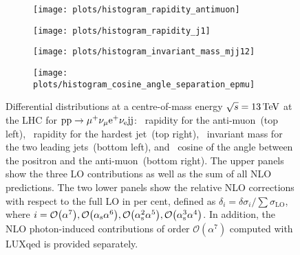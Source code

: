 \documentclass[a4article,11pt]{article}
\begin{document}
\begin{figure}
        \setlength{\parskip}{-10pt}
        \begin{subfigure}{0.49\textwidth}
                \subcaption{}
                \texttt{[image: plots/histogram\_rapidity\_antimuon]}
                \label{plot:rapidity_antimuon}
        \end{subfigure}
        \hfill
        \begin{subfigure}{0.49\textwidth}
                \subcaption{}
                \texttt{[image: plots/histogram\_rapidity\_j1]}
                \label{plot:rapidity_j1} 
        \end{subfigure}
        
        \begin{subfigure}{0.49\textwidth}
                \subcaption{}
                \texttt{[image: plots/histogram\_invariant\_mass\_mjj12]}
                \label{plot:invariant_mass_mjj12}
        \end{subfigure}
        \hfill
        \begin{subfigure}{0.49\textwidth}
                \subcaption{}
                \texttt{[image: plots/histogram\_cosine\_angle\_separation\_epmu]}
                \label{plot:cosine_angle_separation_epmu}
        \end{subfigure}
        
        \vspace*{-3ex}
        \caption{\label{fig:various_distributions}%
                Differential distributions at a centre-of-mass energy $\sqrt{s}=13\,\text{TeV}$ at the LHC for $\text{p}\text{p}\to\mu^+\nu_\mu\text{e}^+\nu_{\text{e}}\text{j}\text{j}$: 
                ~rapidity for the anti-muon~(top left), %
                ~rapidity for the hardest jet~(top right),
                ~invariant mass for the two leading jets~(bottom left), and
                ~cosine of
                the angle between the positron and the anti-muon~(bottom right).
                The upper panels show the three LO contributions as well as the sum of all NLO predictions.
                The two lower panels show the relative NLO corrections with respect to the full LO in per cent,
                defined as $\delta_i = \delta \sigma_{i} / \sum \sigma_{\text{LO}}$, 
                where $i=\mathcal{O}{\left(\alpha^{7}\right)},\mathcal{O}{\left(\alpha_\text{s}\alpha^{6}\right)},\mathcal{O}{\left(\alpha_\text{s}^2\alpha^{5}\right)},\mathcal{O}{\left(\alpha_\text{s}^3\alpha^{4}\right)}$.
                In addition, the NLO photon-induced contributions of order $\mathcal{O}{\left(\alpha^{7}\right)}$ computed with LUXqed is provided separately.}
\end{figure}
\end{document}
